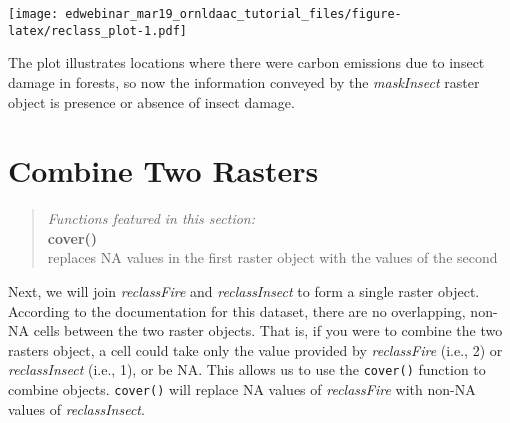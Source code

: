 \documentclass[
]{article}
\newenvironment{Shaded}{\begin{snugshade}}{\end{snugshade}}
\newcommand{\AttributeTok}[1]{\textcolor[rgb]{0.13,0.29,0.53}{#1}}
\newcommand{\ConstantTok}[1]{\textcolor[rgb]{0.56,0.35,0.01}{#1}}
\newcommand{\FloatTok}[1]{\textcolor[rgb]{0.00,0.00,0.81}{#1}}
\newcommand{\FunctionTok}[1]{\textcolor[rgb]{0.13,0.29,0.53}{\textbf{#1}}}
\newcommand{\NormalTok}[1]{#1}
\newcommand{\SpecialCharTok}[1]{\textcolor[rgb]{0.81,0.36,0.00}{\textbf{#1}}}
\newcommand{\StringTok}[1]{\textcolor[rgb]{0.31,0.60,0.02}{#1}}
\begin{document}
\begin{Shaded}
\end{Shaded}

\texttt{[image: edwebinar\_mar19\_ornldaac\_tutorial\_files/figure-latex/reclass\_plot-1.pdf]}

The plot illustrates locations where there were carbon emissions due to
insect damage in forests, so now the information conveyed by the
\emph{maskInsect} raster object is presence or absence of insect damage.

\hypertarget{combine-two-rasters}{%
\section{Combine Two Rasters}\label{combine-two-rasters}}

\begin{quote}
\emph{Functions featured in this section:}\\
\textbf{cover()}\\
replaces NA values in the first raster object with the values of the
second
\end{quote}

Next, we will join \emph{reclassFire} and \emph{reclassInsect} to form a
single raster object. According to the documentation for this dataset,
there are no overlapping, non-NA cells between the two raster objects.
That is, if you were to combine the two rasters object, a cell could
take only the value provided by \emph{reclassFire} (i.e., 2) or
\emph{reclassInsect} (i.e., 1), or be NA. This allows us to use the
\texttt{cover()} function to combine objects. \texttt{cover()} will
replace NA values of \emph{reclassFire} with non-NA values of
\emph{reclassInsect}.
\end{document}
